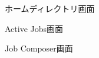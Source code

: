 \begin{figure}[t]
    \centering
    \caption{ホームディレクトリ画面}
    \label{homedirectory}
\end{figure}

\begin{figure}[t]
    \centering
    \caption{Active Jobs画面}
    \label{activejobs}
\end{figure}


\begin{figure}[b]
    \centering
    \caption{Job Composer画面}
    \label{jobcomposer}
\end{figure}


